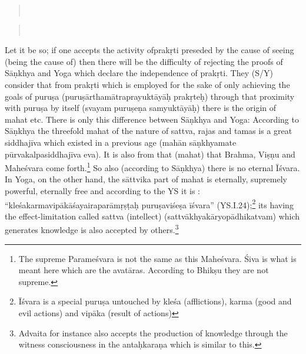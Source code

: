 \begin{verse}
\\
\end{verse}
\begin{verse}
\\
\end{verse}


Let it be so; if one accepts the activity ofprakṛti  preseded by the cause of seeing  (being the cause of) then there will be the difficulty of rejecting the proofs of Sāṇkhya and Yoga which  declare the independence of prakṛti. They (S/Y) consider that from prakṛti which is employed for the sake of only achieving the goals of puruṣa (puruṣārthamātraprayuktāyāḥ prakṛteḥ) through that proximity with puruṣa by itself (svayam puruṣeṇa samyuktāyāḥ) there is the origin of mahat etc. There is only this difference between Sāṇkhya and Yoga: According to Sāṇkhya the threefold mahat of the nature of sattva, rajas and tamas is a great siddhajīva which existed in a previous age (mahān sāṇkhyamate pūrvakalpasiddhajīva eva). It is also from that (mahat) that Brahma, Viṣṇu and Maheśvara come forth.\footnote{The supreme Parameśvara is not the same as this Maheśvara. Śiva is what is meant here which are the avatāras. According to Bhikṣu they are not supreme.} So also (according to Sāṇkhya) there is no eternal Īśvara. In Yoga, on the other hand, the sāttvika part of mahat is eternally, supremely powerful, eternally free and according to the YS it is : “kleśakarmavipākāśayairaparāmṛṣṭaḥ puruṣaviśeṣa īśvara” (YS.I.24);\footnote{Īśvara is a special puruṣa untouched by kleśa (afflictions), karma (good and evil actions) and vipāka (result of actions)} its having the effect-limitation called sattva (intellect) (sattvākhyakāryopādhikatvam) which generates knowledge is also accepted by others.\footnote{Advaita for instance also accepts the production of knowledge through the witness consciousness in the antaḥkaraṇa which is similar to this.} 

